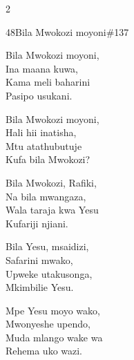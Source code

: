 \begin{multicols}{2}
\begin{hymn}{48}{Bila Mwokozi moyoni}{\#137}
\begin{stanza}
Bila Mwokozi moyoni,\\
Ina maana kuwa,\\
Kama meli baharini\\
Pasipo usukani.
\end{stanza}
\begin{chorus}
Bila Mwokozi moyoni,\\
Hali hii inatisha,\\
Mtu atathubutuje\\
Kufa bila Mwokozi?
\end{chorus}
\begin{stanza}
Bila Mwokozi, Rafiki,\\
Na bila mwangaza,\\
Wala taraja kwa Yesu\\
Kufariji njiani.
\end{stanza}
\begin{stanza}
Bila Yesu, msaidizi,\\
Safarini mwako,\\
Upweke utakusonga,\\
Mkimbilie Yesu.
\end{stanza}
\begin{stanza}
Mpe Yesu moyo wako,\\
Mwonyeshe upendo,\\
Muda mlango wake wa\\
Rehema uko wazi.
\end{stanza}
\end{hymn}


\end{multicols}
